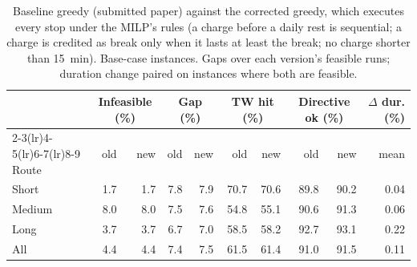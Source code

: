 \begin{table}[htbp]
\centering
\caption{Baseline greedy (submitted paper) against the corrected greedy, which executes every stop under the MILP's rules (a charge before a daily rest is sequential; a charge is credited as break only when it lasts at least the break; no charge shorter than 15~min).  Base-case instances.  Gaps over each version's feasible runs; duration change paired on instances where both are feasible.}
\label{tab:greedy-corrected}
\begin{tabular}{l rr rr rr rr r}
\toprule
 & \multicolumn{2}{c}{Infeasible (\%)} & \multicolumn{2}{c}{Gap (\%)} & \multicolumn{2}{c}{TW hit (\%)} & \multicolumn{2}{c}{Directive ok (\%)} & $\Delta$ dur. (\%) \\
\cmidrule(lr){2-3}\cmidrule(lr){4-5}\cmidrule(lr){6-7}\cmidrule(lr){8-9}
Route & old & new & old & new & old & new & old & new & mean \\
\midrule
Short & 1.7 & 1.7 & 7.8 & 7.9 & 70.7 & 70.6 & 89.8 & 90.2 & 0.04 \\
Medium & 8.0 & 8.0 & 7.5 & 7.6 & 54.8 & 55.1 & 90.6 & 91.3 & 0.06 \\
Long & 3.7 & 3.7 & 6.7 & 7.0 & 58.5 & 58.2 & 92.7 & 93.1 & 0.22 \\
All & 4.4 & 4.4 & 7.4 & 7.5 & 61.5 & 61.4 & 91.0 & 91.5 & 0.11 \\
\bottomrule
\end{tabular}
\end{table}
